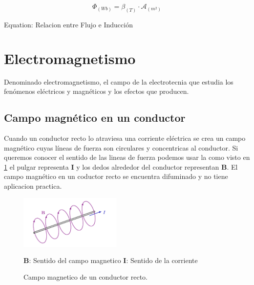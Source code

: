 \documentclass{report}
\begin{document}
\begin{center}
  \label{eq:Relacion entre Flujo e Inducción}
  \[\Phi_{(Wb)} = \beta_{\mathit{(T)}} \cdot \mathcal{A}_{(m^2)}\]

Equation: Relacion entre Flujo e Inducción
\end{center}
\vspace{1em}
  \section{Electromagnetismo }\label{sec:electromagnetismo}

Denominado electromagnetismo, el campo de la electrotecnia que estudia los fenómenos eléctricos y magnéticos
y los efectos que producen.

  \subsection{Campo magnético en un conductor } \label{ssec:campo_magnetico_conductor}
Cuando un conductor recto lo atraviesa una corriente eléctrica se crea un campo magnético cuyas líneas de fuerza son circulares y concentricas al conductor. 
Si queremos conocer el sentido de las lineas de fuerza podemos usar la  como visto en \ref{fig:Campo Magnetico de un conductor recto}
el pulgar representa \(\mathbf{I}\) y los dedos alrededor del conductor representan \(\mathbf{B}\).
El campo magnético en un coductor recto se encuentra difuminado y no tiene aplicacion practica.
\begin{figure}[h]
  \centering
  \caption{Campo magnetico de un conductor recto.}
  \label{fig:Campo Magnetico de un conductor recto}
  \vspace{.5em}
  \includegraphics[width=0.45\textwidth]{magnetic_field_wire.pdf}
  \vspace{.5em}
  \begin{center}
    \(\mathbf{B}\): Sentido del campo magnetico  \(\mathbf{I}\): Sentido de la corriente
  \end{center}
\end{figure}
\newpage
\end{document}
